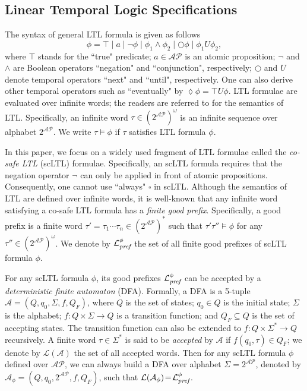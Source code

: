 \documentclass{ifacconf}
\def \AP{\mathcal{AP}}
\def \A{\mathcal{A}}
\def \L{\mathcal{L}}
\def \pref{\emph{\text{pref}}}
\begin{document}
 
 
\subsection{Linear Temporal Logic Specifications}
%
The syntax of general LTL formula is given as follows
\[
\phi=\top\mid a \mid\neg \phi \mid\phi_1\wedge\phi_2 \mid\bigcirc\phi\mid\phi_1 U \phi_2, 
\]
where 
$\top$ stands for the ``true" predicate; 
$a\!\in\!\mathcal{AP}$ is an atomic proposition; 
$\neg$ and $\wedge$ are Boolean operators ``negation" and ``conjunction", respectively; 
$\bigcirc$ and $U$ denote temporal operators ``next" and ``until", respectively. 
One can also derive other temporal operators such as 
``eventually"  by $\lozenge \phi \!=\!\top U \phi$.   
LTL formulae are evaluated over infinite words; the readers are referred to \cite{baier2008principles} for the semantics of LTL.   
Specifically, an infinite word $\tau\!\in\! (2^{\mathcal{AP}})^\omega$ is an infinite sequence over alphabet $2^{\mathcal{AP}}$. 
We write $\tau\!\models\! \phi$ if $\tau$ satisfies LTL formula $\phi$. 

In this paper, we focus on a widely used fragment of LTL formulae called the \emph{co-safe LTL} (scLTL) formulae.   
Specifically, an scLTL formula requires that  the negation operator $\neg$ can only be applied in front of atomic propositions. 
Consequently, one cannot use ``always" $\square$ in scLTL. 
Although the semantics of LTL are defined over infinite words,  it is well-known that any infinite word satisfying a co-safe LTL formula has a \emph{finite good prefix}.   
Specifically,  a good prefix is a finite word $\tau'=\tau_1\cdots \tau_n\in (2^{\mathcal{AP}})^*$ such that $\tau'\tau''\models\phi$ for any $\tau'' \in (2^{\mathcal{AP}})^\omega$.   
We denote by $\L_{\pref}^\phi$ the set of all finite good prefixes of scLTL formula $\phi$.

For any scLTL formula $\phi$, its good prefixes $\L_{\pref}^\phi$ can be accepted by a \emph{deterministic finite automaton} (DFA). Formally, a DFA is a 5-tuple
$\A=(Q,q_0,\Sigma,f,Q_F)$, where
$Q$ is the set of states; $q_0\in Q$ is the initial state; $\Sigma$ is the alphabet;
$f\!:\!Q\times \Sigma\!\to\! Q$ is a transition function; and $Q_F\subseteq Q$ is the set of accepting states. 
The transition function can also be extended  to $f\!:\!Q\times \Sigma^*\!\to\! Q$ recursively. 
A finite word $\tau\in \Sigma^*$ is said to be \emph{accepted} by $\A$  if $f(q_0,\tau)\in Q_F$; we denote by $\L(\A)$ the set of all accepted words. 
Then for any scLTL formula $\phi$ defined over $\AP$,   we can always build a DFA over alphabet $\Sigma=2^{\AP}$, denoted by  $\A_\phi\!=\!(Q,q_0,2^{\AP},f,Q_F)$, such that $\L(\A_\phi)\!=\!\L_\pref^\phi$.    
\end{document}
